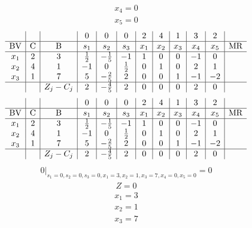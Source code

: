 \documentclass{article}
\begin{document}
\begin{align*}
x_{4}=0\end{align*}
\begin{align*}
x_{5}=0\end{align*}
\begin{align*}
\begin{array}{c|c|c|c|c|c|c|c|c|c|c|c}
 &  &  & 0 & 0 & 0 & 2 & 4 & 1 & 3 & 2 & \\
\hline
\text{BV} & \text{C} & \text{B} & s_{1} & s_{2} & s_{3} & x_{1} & x_{2} & x_{3} & x_{4} & x_{5} & \text{MR} \\
\hline
x_{1} & 2 & 3 & \frac{1}{2} & -\frac{1}{5} & -1 & 1 & 0 & 0 & -1 & 0 \\
x_{2} & 4 & 1 & -1 & 0 & \frac{1}{2} & 0 & 1 & 0 & 2 & 1 \\
x_{3} & 1 & 7 & 5 & -\frac{2}{5} & 2 & 0 & 0 & 1 & -1 & -2 \\
\hline
 &  & Z_j-C_j & 2 & -\frac{4}{5} & 2 & 0 & 0 & 0 & 2 & 0 & \\
\end{array}
\end{align*}
\begin{align*}
\begin{array}{c|c|c|c|c|c|c|c|c|c|c|c}
 &  &  & 0 & 0 & 0 & 2 & 4 & 1 & 3 & 2 & \\
\hline
\text{BV} & \text{C} & \text{B} & s_{1} & s_{2} & s_{3} & x_{1} & x_{2} & x_{3} & x_{4} & x_{5} & \text{MR} \\
\hline
x_{1} & 2 & 3 & \frac{1}{2} & -\frac{1}{5} & -1 & 1 & 0 & 0 & -1 & 0 \\
x_{2} & 4 & 1 & -1 & 0 & \frac{1}{2} & 0 & 1 & 0 & 2 & 1 \\
x_{3} & 1 & 7 & 5 & -\frac{2}{5} & 2 & 0 & 0 & 1 & -1 & -2 \\
\hline
 &  & Z_j-C_j & 2 & -\frac{4}{5} & 2 & 0 & 0 & 0 & 2 & 0 & \\
\end{array}
\end{align*}
\begin{align*}
\left.0\right|_{s_{1}=0,s_{2}=0,s_{3}=0,x_{1}=3,x_{2}=1,x_{3}=7,x_{4}=0,x_{5}=0}=0\end{align*}
\begin{align*}
Z=0\end{align*}
\begin{align*}
x_{1}=3\end{align*}
\begin{align*}
x_{2}=1\end{align*}
\begin{align*}
x_{3}=7\end{align*}
\end{document}

